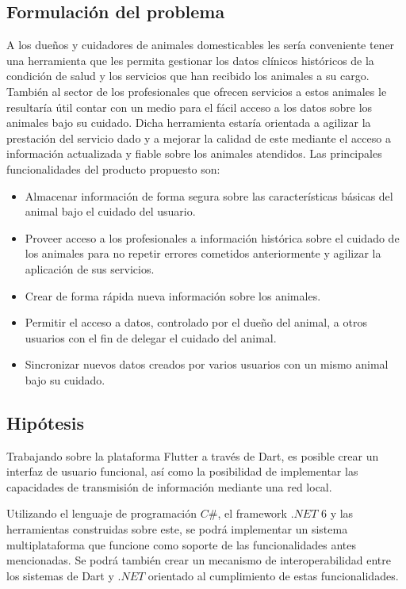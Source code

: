 \subsection*{Formulaci\'on del problema}

A los dueños y cuidadores de animales domesticables les sería conveniente tener una herramienta que les permita gestionar los datos clínicos históricos de la condición de salud y los servicios que han recibido los animales a su cargo. También al sector de los profesionales que ofrecen servicios a estos animales le resultaría útil contar con un medio para el fácil acceso a los datos sobre los animales bajo su cuidado. Dicha herramienta estaría orientada a agilizar la prestación del servicio dado y a mejorar la calidad de este mediante el acceso a información actualizada y fiable sobre los animales atendidos. Las principales funcionalidades del producto propuesto son:
\begin{itemize}
\item Almacenar información de forma segura sobre las características básicas del animal bajo el cuidado del usuario.
\item Proveer acceso a los profesionales a información histórica sobre el cuidado de los animales para no repetir errores cometidos anteriormente y agilizar la aplicación de sus servicios.
\item Crear de forma rápida nueva información sobre los animales.
\item Permitir el acceso a datos, controlado por el dueño del animal, a otros usuarios con el fin de delegar el cuidado del animal.
\item Sincronizar nuevos datos creados por varios usuarios con un mismo animal bajo su cuidado.
\end{itemize}

\subsection*{Hip\'otesis}

Trabajando sobre la plataforma Flutter a trav\'es de Dart, es posible crear un interfaz de usuario funcional, as\'i como la posibilidad de implementar las capacidades de transmisi\'on de informaci\'on mediante una red local.

Utilizando el lenguaje de programación $C\#$, el framework $.NET$ 6 y las herramientas construidas sobre este, se podrá implementar un sistema multiplataforma que funcione como soporte de las funcionalidades antes mencionadas. Se podrá también crear un mecanismo de interoperabilidad entre los sistemas de Dart y $.NET$ orientado al cumplimiento de estas funcionalidades.



